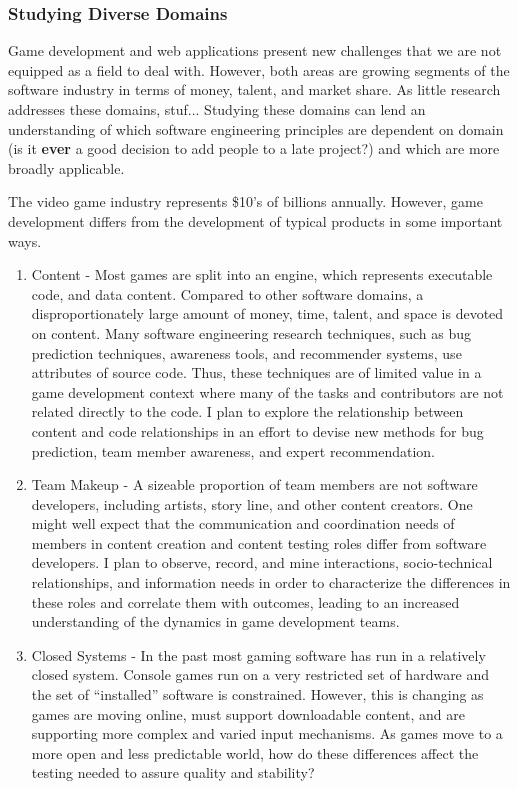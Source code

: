 \documentclass[10pt]{article}
\newcommand\Subsection[1]{\subsubsection*{\small #1}}
\begin{document}
\begin{small}
\Subsection{Studying Diverse Domains}

Game development and web applications present new challenges that we are not
equipped as a field to deal with.  However, both areas are growing segments of
the software industry in terms of money, talent, and market share.  As little
research addresses these domains, stuf...  Studying these domains can lend an understanding
of which software engineering principles are dependent on domain  (is it \textbf{ever}
a good decision to add people to a late project?) and which are more broadly applicable.


The video game industry represents \$10's of billions annually. However, game
development differs from the development of typical products in some important
ways.

\begin{enumerate}

\item Content - Most games are split into an engine, which represents executable code,
    and data content. Compared to other software domains, a disproportionately large
    amount of money, time, talent, and space is devoted on content.  
    Many software engineering research techniques, such as
    bug prediction techniques, awareness tools, and recommender systems, use attributes
    of source code. Thus, these techniques are of limited value
    in a game development context where many of the tasks and contributors are
    not related directly to the code. I plan to explore the relationship between content
    and code relationships in an effort to devise new
    methods for bug prediction, team member awareness, and expert recommendation.

\item Team Makeup - A sizeable proportion of team members
    are not software developers, including artists, story line, and other content creators.
    One might well expect that the communication and coordination needs of members
    in content creation and content testing roles differ from software developers.  I plan to observe, record, and mine
    interactions, socio-technical relationships, and information 
    needs in order to characterize the differences in these roles
    and correlate them with outcomes, leading 
    to an increased understanding of the dynamics in game development teams.

\item Closed Systems - In the past most gaming software has run in a relatively closed
    system. Console games run on a very restricted set of hardware and the set of ``installed''
    software is constrained.  However, this is changing as games are moving online,
    must support downloadable content, and are supporting more complex and varied input 
    mechanisms.  As games move to a more open and less predictable world,
    how do these differences affect the testing needed to assure quality and stability?  


\end{enumerate}
\end{small}
\end{document}
